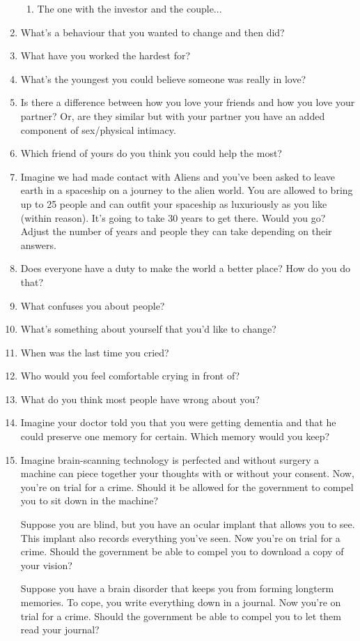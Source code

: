 \documentclass[11pt]{article}
\begin{document}
\begin{enumerate}
\begin{enumerate}
			\item The one with the investor and the couple...
		\end{enumerate}

	\item What's a behaviour that you wanted to change and then did?
	\item What have you worked the hardest for?
	\item What's the youngest you could believe someone was really in love?
	\item Is there a difference between how you love your friends and how you love your partner? Or, are they similar but 
		with your partner you have an added component of sex/physical intimacy.
	\item Which friend of yours do you think you could help the most?
	\item Imagine we had made contact with Aliens and you've been asked to leave earth in a spaceship on a journey to the alien 
		world. You are allowed to bring up to 25 people and can outfit your spaceship as luxuriously as you like (within reason).
		It's going to take 30 years to get there. Would you go? Adjust the number of years and people they can take depending on 
		their answers.
	\item Does everyone have a duty to make the world a better place? How do you do that?
	\item What confuses you about people?
	\item What's something about yourself that you'd like to change?
	\item When was the last time you cried?
	\item Who would you feel comfortable crying in front of?
	\item What do you think most people have wrong about you?
	\item Imagine your doctor told you that you were getting dementia and that he could preserve one memory for certain.
		Which memory would you keep?
	
	\item Imagine brain-scanning technology is perfected and without surgery a machine can
		piece together your thoughts with or without your consent.  Now, you're on trial
		for a crime.  Should it be allowed for the government to compel you to sit down
		in the machine?

		Suppose you are blind, but you have an ocular implant that allows you to see.
		This implant also records everything you've seen.  Now you're on trial for a crime.
		Should the government be able to compel you to download a copy of your vision?

		Suppose you have a brain disorder that keeps you from forming longterm memories.
		To cope, you write everything down in a journal.  Now you're on trial for a crime.
		Should the government be able to compel you to let them read your journal?



	





\end{enumerate}
\end{document}
